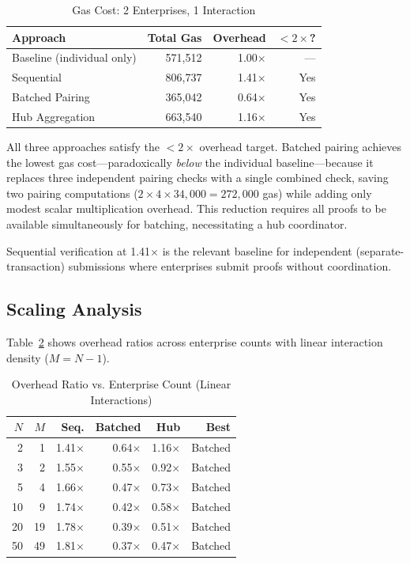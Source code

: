\begin{table}[htbp]
\centering
\caption{Gas Cost: 2 Enterprises, 1 Interaction}
\label{tab:gas-primary}
\begin{tabular}{@{}lrrr@{}}
\toprule
Approach & Total Gas & Overhead & $< 2\times$? \\
\midrule
Baseline (individual only) & 571,512 & 1.00$\times$ & --- \\
Sequential & 806,737 & 1.41$\times$ & Yes \\
Batched Pairing & 365,042 & 0.64$\times$ & Yes \\
Hub Aggregation & 663,540 & 1.16$\times$ & Yes \\
\bottomrule
\end{tabular}
\end{table}

All three approaches satisfy the $< 2\times$ overhead target. Batched pairing
achieves the lowest gas cost---paradoxically \emph{below} the individual
baseline---because it replaces three independent pairing checks with a single
combined check, saving two pairing computations ($2 \times 4 \times 34{,}000
= 272{,}000$ gas) while adding only modest scalar multiplication overhead.
This reduction requires all proofs to be available simultaneously for batching,
necessitating a hub coordinator.

Sequential verification at 1.41$\times$ is the relevant baseline for
independent (separate-transaction) submissions where enterprises submit proofs
without coordination.

\subsection{Scaling Analysis}

Table~\ref{tab:scaling} shows overhead ratios across enterprise counts with
linear interaction density ($M = N - 1$).

\begin{table}[htbp]
\centering
\caption{Overhead Ratio vs. Enterprise Count (Linear Interactions)}
\label{tab:scaling}
\begin{tabular}{@{}rrrrrr@{}}
\toprule
$N$ & $M$ & Seq. & Batched & Hub & Best \\
\midrule
2 & 1 & 1.41$\times$ & 0.64$\times$ & 1.16$\times$ & Batched \\
3 & 2 & 1.55$\times$ & 0.55$\times$ & 0.92$\times$ & Batched \\
5 & 4 & 1.66$\times$ & 0.47$\times$ & 0.73$\times$ & Batched \\
10 & 9 & 1.74$\times$ & 0.42$\times$ & 0.58$\times$ & Batched \\
20 & 19 & 1.78$\times$ & 0.39$\times$ & 0.51$\times$ & Batched \\
50 & 49 & 1.81$\times$ & 0.37$\times$ & 0.47$\times$ & Batched \\
\bottomrule
\end{tabular}
\end{table}

